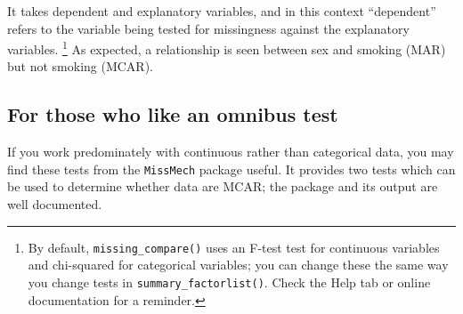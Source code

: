 \documentclass[
  12pt,
  krantz2]{krantz}
\makeatletter
\newenvironment{Shaded}{\begin{snugshade}}{\end{snugshade}}
\newcommand{\KeywordTok}[1]{\textcolor[rgb]{0.13,0.29,0.53}{\textbf{#1}}}
\newcommand{\NormalTok}[1]{#1}
\newcommand{\OperatorTok}[1]{\textcolor[rgb]{0.81,0.36,0.00}{\textbf{#1}}}
\newcommand{\StringTok}[1]{\textcolor[rgb]{0.31,0.60,0.02}{#1}}
\newenvironment{kframe}{%
\medskip{}
\setlength{\fboxsep}{.8em}
 \def\at@end@of@kframe{}%
 \ifinner\ifhmode%
  \def\at@end@of@kframe{\end{minipage}}%
  \begin{minipage}{\columnwidth}%
 \fi\fi%
 \def\FrameCommand##1{\hskip\@totalleftmargin \hskip-\fboxsep
 \colorbox{shadecolor}{##1}\hskip-\fboxsep
     \hskip-\linewidth \hskip-\@totalleftmargin \hskip\columnwidth}%
 \MakeFramed {\advance\hsize-\width
   \@totalleftmargin\z@ \linewidth\hsize
   \@setminipage}}%
 {\par\unskip\endMakeFramed%
 \at@end@of@kframe}
\renewenvironment{Shaded}{\begin{kframe}}{\end{kframe}}
\makeatother
\begin{document}
\begin{Shaded}
\end{Shaded}

\begin{table}[!h]

\caption{\label{tab:unnamed-chunk-14}Missing data comparison: Smoking (MAR).}
\centering
{}
\end{table}

It takes dependent and explanatory variables, and in this context ``dependent'' refers to the variable being tested for missingness against the explanatory variables.
\footnote{By default, \texttt{missing\_compare()} uses an F-test test for continuous variables and chi-squared for categorical variables; you can change these the same way you change tests in \texttt{summary\_factorlist()}.
  Check the Help tab or online documentation for a reminder.}
As expected, a relationship is seen between sex and smoking (MAR) but not smoking (MCAR).

\hypertarget{for-those-who-like-an-omnibus-test}{%
\subsection{For those who like an omnibus test}\label{for-those-who-like-an-omnibus-test}}

If you work predominately with continuous rather than categorical data, you may find these tests from the \texttt{MissMech} package useful.
It provides two tests which can be used to determine whether data are MCAR; the package and its output are well documented.
\end{document}
